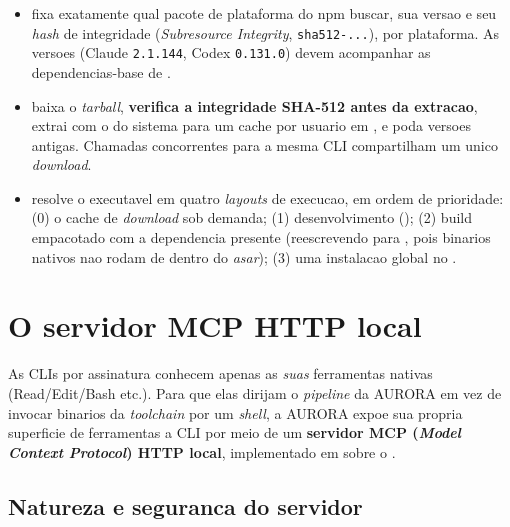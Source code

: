 \begin{itemize}[leftmargin=1.4em]
  \item {} fixa exatamente qual pacote de
        plataforma do npm buscar, sua versao e seu \emph{hash} de integridade
        (\emph{Subresource Integrity}, \lstinline|sha512-...|), por plataforma.
        As versoes (Claude \lstinline|2.1.144|, Codex \lstinline|0.131.0|) devem
        acompanhar as dependencias-base de .
  \item {} baixa o \emph{tarball}, \textbf{verifica
        a integridade SHA-512 antes da extracao}, extrai com o  do
        sistema para um cache por usuario em
        , e poda versoes antigas.
        Chamadas concorrentes para a mesma CLI compartilham um unico
        \emph{download}.
  \item {} resolve o executavel em quatro \emph{layouts}
        de execucao, em ordem de prioridade: (0) o cache de \emph{download} sob
        demanda; (1) desenvolvimento (); (2) build empacotado
        com a dependencia presente (reescrevendo  para
        , pois binarios nativos nao rodam de dentro do
        \emph{asar}); (3) uma instalacao global no .
\end{itemize}

\section{O servidor MCP HTTP local}

As CLIs por assinatura conhecem apenas as \emph{suas} ferramentas nativas
(Read/Edit/Bash etc.). Para que elas dirijam o \emph{pipeline} da AURORA em vez
de invocar binarios da \emph{toolchain} por um \emph{shell}, a AURORA expoe sua
propria superficie de ferramentas a CLI por meio de um \textbf{servidor MCP
(\emph{Model Context Protocol}) HTTP local}, implementado em
 sobre o
.

\subsection{Natureza e seguranca do servidor}

